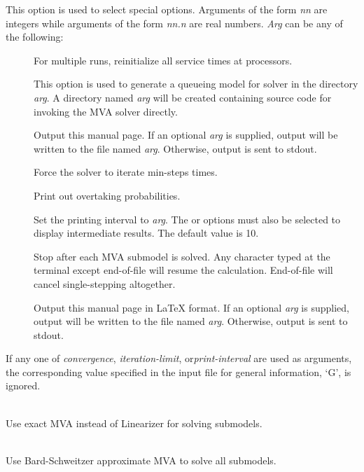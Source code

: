 \begin{description}
This option is used to select special options.  Arguments of the form
\emph{nn} are integers while arguments of the form \emph{nn.n} are real
numbers.  \emph{Arg} can be any of the following:
\begin{description}
\item[]
For multiple runs, reinitialize all service times at processors.
\item[]
This option is used to generate a queueing model for solver in the directory \emph{arg}.
A directory named \emph{arg} will be created containing source code for invoking the MVA solver directly.
\item[]
Output this manual page.  
If an optional \emph{arg}
is supplied, output will be written to the file named \emph{arg}.
Otherwise, output is sent to stdout.
\item[]
Force the solver to iterate min-steps times.
\item[]
Print out overtaking probabilities.
\item[]
Set the printing interval to \emph{arg}.
The  or  options must also be selected to display intermediate results.
The default value is 10.
\item[]
Stop after each MVA submodel is solved.
Any character typed at the terminal except end-of-file will resume the calculation.  End-of-file will cancel single-stepping altogether.
\item[]
Output this manual page in LaTeX format.
If an optional \emph{arg}
is supplied, output will be written to the file named \emph{arg}.
Otherwise, output is sent to stdout.
\end{description}
If any one of \emph{convergence}, \emph{iteration-limit}, or\emph{print-interval} are used as arguments, the corresponding 
value specified in the input file for general information, `G', is
ignored.  
\item[\longopt{exact-mva}]~\\
Use exact MVA instead of Linearizer for solving submodels.
\item[\longopt{schweitzer}]~\\
Use Bard-Schweitzer approximate MVA to solve all submodels.
\item[\longopt{batch-layering}]~\\

\end{description}
